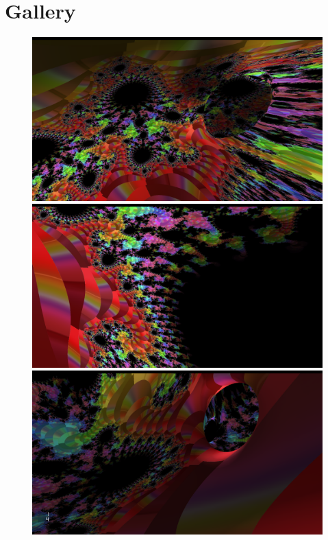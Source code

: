 \documentclass[a4paper]{article}
\begin{document}
\section{Gallery}
\begin{figure}[H]
\centering
\subfigure
{
    \label{fig:subfig1}
    \includegraphics[scale=0.1]{o1.PNG}
}
\subfigure
{
    \label{fig:subfig1}
    \includegraphics[scale=0.1]{o2.PNG}
}
\subfigure
{
    \label{fig:subfig1}
    \includegraphics[scale=0.1]{o3.PNG}
}
\end{figure}
\end{document}
